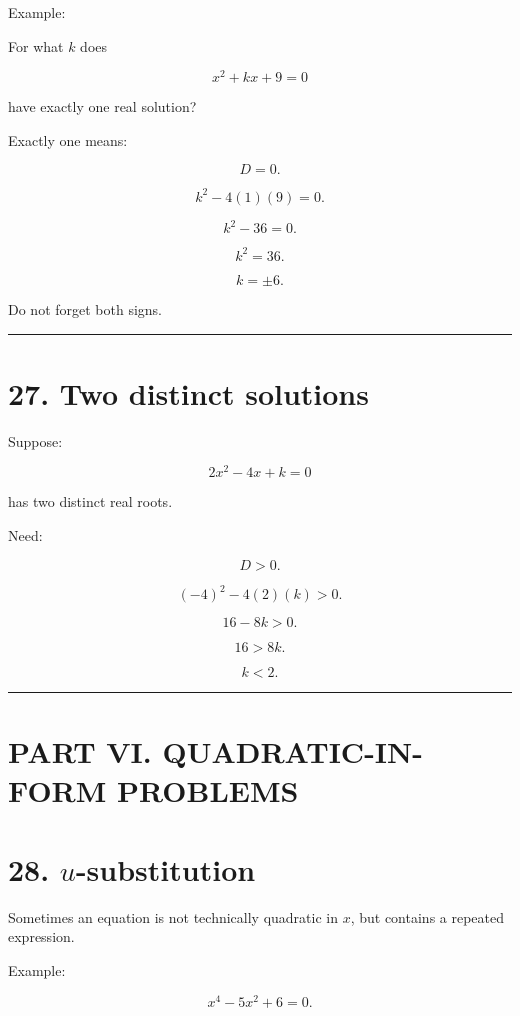 \documentclass[
]{article}
\begin{document}
Example:

For what \(k\) does

\[
x^2+kx+9=0
\]

have exactly one real solution?

Exactly one means:

\[
D=0.
\]

\[
k^2-4(1)(9)=0.
\]

\[
k^2-36=0.
\]

\[
k^2=36.
\]

\[
\boxed{k=\pm6}.
\]

Do not forget both signs.

\begin{center}\rule{0.5\linewidth}{0.5pt}\end{center}

\section{27. Two distinct solutions}\label{two-distinct-solutions}

Suppose:

\[
2x^2-4x+k=0
\]

has two distinct real roots.

Need:

\[
D>0.
\]

\[
(-4)^2-4(2)(k)>0.
\]

\[
16-8k>0.
\]

\[
16>8k.
\]

\[
\boxed{k<2}.
\]

\begin{center}\rule{0.5\linewidth}{0.5pt}\end{center}

\section{PART VI. QUADRATIC-IN-FORM
PROBLEMS}\label{part-vi.-quadratic-in-form-problems}

\section{\texorpdfstring{28.
\(u\)-substitution}{28. u-substitution}}\label{u-substitution}

Sometimes an equation is not technically quadratic in \(x\), but
contains a repeated expression.

Example:

\[
x^4-5x^2+6=0.
\]
\end{document}
